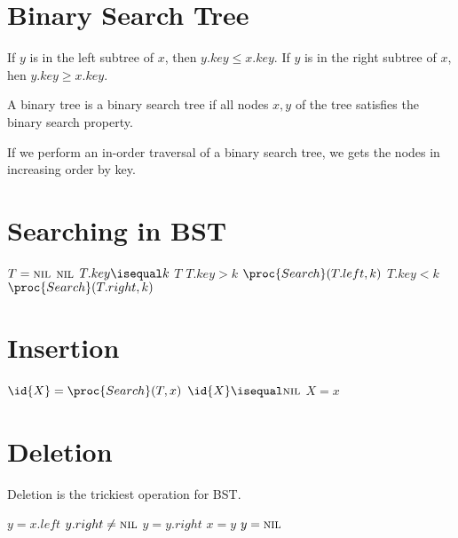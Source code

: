 \section{Binary Search Tree}

\begin{definition}
    If $y$ is in the left subtree of $x$, then $y.key \leq x.key$. If $y$ is in the right subtree of $x$, hen $y.key \geq x.key$.
\end{definition}

\begin{definition}
    A binary tree is a binary search tree if all nodes $x,y$ of the tree satisfies the binary search property.
\end{definition}

If we perform an in-order traversal of a binary search tree, we gets the nodes in increasing order by key.

\section{Searching in BST}

\begin{codebox}
    \li \If $T = \textsc{nil}$
    \li \Then \Return $\textsc{nil}$
    \End
    \li \If $T.key \isequal k$
    \li \Then \Return $T$
    \End
    \li \If $T.key > k$
    \li \Then \Return $\proc{Search}(T.left, k)$
    \End
    \li \If $T.key < k$
    \li \Then \Return $\proc{Search}(T.right,k)$
    \End
\end{codebox}

\section{Insertion}

\begin{codebox}
    \li $\id{X} = \proc{Search}(T,x)$
    \li \If $\id{X} \isequal \textsc{nil}$
    \li \Then $X = x$
    \li \Else
    \li {}
    \li {}
    \li {}
    \li {}
    \li {}
    \End
\end{codebox}

\section{Deletion}

Deletion is the trickiest operation for BST.

\begin{codebox}
    \li $y = x.left$
    \li \While $y.right \neq \textsc{nil}$ \Do
    \li $y = y.right$
    \End
    \li $x = y$
    \li $y = \textsc{nil}$
\end{codebox}